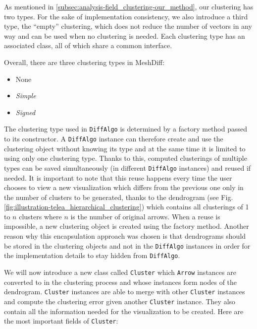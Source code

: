 As mentioned in \ref{subsec:analysis-field_clustering-our_method}, our clustering has two types. For the sake of implementation consistency, we also introduce a third type, the ``empty'' clustering, which does not reduce the number of vectors in any way and can be used when no clustering is needed. Each clustering type has an associated class, all of which share a common interface.

Overall, there are three clustering types in MeshDiff:

\begin{itemize}
\item None
\item {\it Simple}
\item {\it Signed}
\end{itemize}

The clustering type used in \verb+DiffAlgo+ is determined by a factory method passed to its constructor. A \verb+DiffAlgo+ instance can therefore create and use the clustering object without knowing its type and at the same time it is limited to using only one clustering type. Thanks to this, computed clusterings of multiple types can be saved simultaneously (in different \verb+DiffAlgo+ instances) and reused if needed. It is important to note that this reuse happens every time the user chooses to view a new visualization which differs from the previous one only in the number of clusters to be generated, thanks to the dendrogram (see Fig. \ref{fig:illustration-telea_hierarchical_clustering}) which contains all clusterings of 1 to \(n\) clusters where \(n\) is the number of original arrows. When a reuse is impossible, a new clustering object is created using the factory method. Another reason why this encapsulation approach was chosen is that dendrograms should be stored in the clustering objects and not in the \verb+DiffAlgo+ instances in order for the implementation details to stay hidden from \verb+DiffAlgo+.

We will now introduce a new class called \verb+Cluster+ which \verb+Arrow+ instances are converted to in the clustering process and whose instances form nodes of the dendrogram. \verb+Cluster+ instances are able to merge with other \verb+Cluster+ instances and compute the clustering error given another \verb+Cluster+ instance. They also contain all the information needed for the visualization to be created. Here are the most important fields of \verb+Cluster+:


